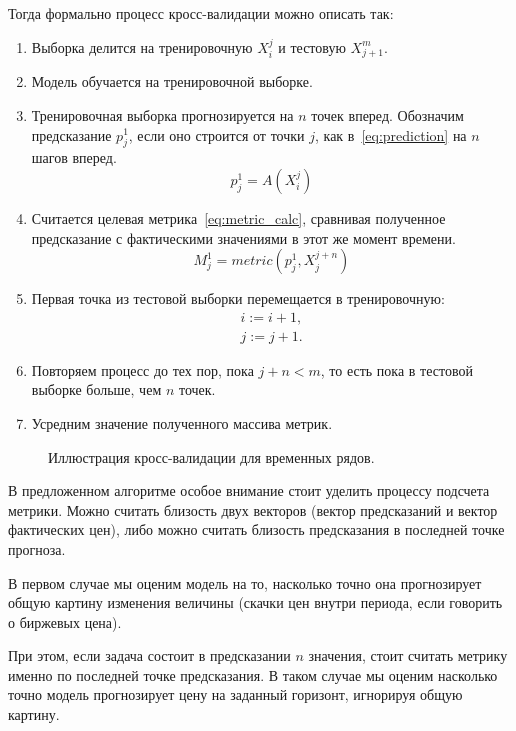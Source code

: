 \documentclass[a4paper,article,14pt]{extarticle}
\begin{document}
Тогда формально процесс кросс-валидации можно описать так:

\begin{enumerate}
    \item Выборка делится на тренировочную $X^j_i$ и тестовую $X^m_{j + 1}$.
    \item Модель обучается на тренировочной выборке.
    \item Тренировочная выборка прогнозируется на $n$ точек вперед.
    Обозначим предсказание $p_j^1$, если оно строится от точки $j$, как в~\eqref{eq:prediction} на $n$ шагов вперед.
    \begin{equation}
        \label{eq:prediction}
        p_j^1 = A(X^j_i)
    \end{equation}
    \item Считается целевая метрика~\eqref{eq:metric_calc}, сравнивая полученное предсказание с фактическими значениями в этот же момент времени.
    \begin{equation}
        \label{eq:metric_calc}
        M_j^1 = metric(p_j^1, X^{j+n}_j)
    \end{equation}
    \item Первая точка из тестовой выборки перемещается в тренировочную:
    \begin{equation}
        \label{eq:next_iter}
        \begin{aligned}
            i := i + 1, \\
            j := j + 1.
        \end{aligned}
    \end{equation} %
    \item Повторяем процесс до тех пор, пока $j + n < m$, то есть пока в тестовой выборке больше, чем $n$ точек.
    \item Усредним значение полученного массива метрик.
\end{enumerate}

\begin{figure}
    \begin{center}
        \label{fig:cross-validation}
        \caption{Иллюстрация кросс-валидации для временных рядов.}
    \end{center}
\end{figure}

\par
В предложенном алгоритме особое внимание стоит уделить процессу подсчета метрики.
Можно считать близость двух векторов (вектор предсказаний и вектор фактических цен), либо можно считать близость предсказания в последней точке прогноза.
\par
В первом случае мы оценим модель на то, насколько точно она прогнозирует общую картину изменения величины (скачки цен внутри периода, если говорить о биржевых цена).
\par
При этом, если задача состоит в предсказании $n$ значения, стоит считать метрику именно по последней точке предсказания.
В таком случае мы оценим насколько точно модель прогнозирует цену на заданный горизонт, игнорируя общую картину.
\end{document}
